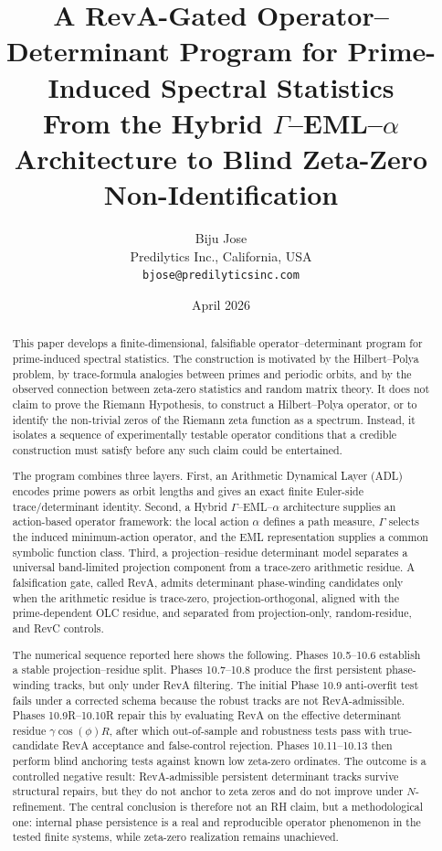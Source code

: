 \documentclass[11pt]{article}
\title{A RevA-Gated Operator--Determinant Program for Prime-Induced Spectral Statistics\\
\large From the Hybrid $\Gamma$--EML--$\alpha$ Architecture to Blind Zeta-Zero Non-Identification}
\author{Biju Jose\\Predilytics Inc., California, USA\\\texttt{bjose@predilyticsinc.com}}
\date{April 2026}
\theoremstyle{definition}
\theoremstyle{plain}
\begin{document}
\maketitle

\begin{abstract}
This paper develops a finite-dimensional, falsifiable operator--determinant program for prime-induced spectral statistics.  The construction is motivated by the Hilbert--Polya problem, by trace-formula analogies between primes and periodic orbits, and by the observed connection between zeta-zero statistics and random matrix theory.  It does not claim to prove the Riemann Hypothesis, to construct a Hilbert--Polya operator, or to identify the non-trivial zeros of the Riemann zeta function as a spectrum.  Instead, it isolates a sequence of experimentally testable operator conditions that a credible construction must satisfy before any such claim could be entertained.

The program combines three layers.  First, an Arithmetic Dynamical Layer (ADL) encodes prime powers as orbit lengths and gives an exact finite Euler-side trace/determinant identity.  Second, a Hybrid $\Gamma$--EML--$\alpha$ architecture supplies an action-based operator framework: the local action $\alpha$ defines a path measure, $\Gamma$ selects the induced minimum-action operator, and the EML representation supplies a common symbolic function class.  Third, a projection--residue determinant model separates a universal band-limited projection component from a trace-zero arithmetic residue.  A falsification gate, called RevA, admits determinant phase-winding candidates only when the arithmetic residue is trace-zero, projection-orthogonal, aligned with the prime-dependent OLC residue, and separated from projection-only, random-residue, and RevC controls.

The numerical sequence reported here shows the following.  Phases 10.5--10.6 establish a stable projection--residue split.  Phases 10.7--10.8 produce the first persistent phase-winding tracks, but only under RevA filtering.  The initial Phase 10.9 anti-overfit test fails under a corrected schema because the robust tracks are not RevA-admissible.  Phases 10.9R--10.10R repair this by evaluating RevA on the effective determinant residue $\gamma\cos(\phi)R$, after which out-of-sample and robustness tests pass with true-candidate RevA acceptance and false-control rejection.  Phases 10.11--10.13 then perform blind anchoring tests against known low zeta-zero ordinates.  The outcome is a controlled negative result: RevA-admissible persistent determinant tracks survive structural repairs, but they do not anchor to zeta zeros and do not improve under $N$-refinement.  The central conclusion is therefore not an RH claim, but a methodological one: internal phase persistence is a real and reproducible operator phenomenon in the tested finite systems, while zeta-zero realization remains unachieved.
\end{abstract}
\end{document}
